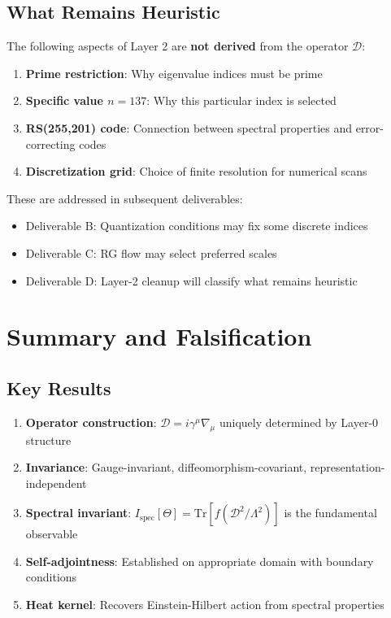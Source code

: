 \documentclass[12pt]{article}
\newcommand{\Tr}{\mathrm{Tr}}
\begin{document}
\subsection{What Remains Heuristic}

The following aspects of Layer 2 are \textbf{not derived} from the operator $\mathcal{D}$:
\begin{enumerate}
    \item \textbf{Prime restriction}: Why eigenvalue indices must be prime
    \item \textbf{Specific value $n=137$}: Why this particular index is selected
    \item \textbf{RS(255,201) code}: Connection between spectral properties and error-correcting codes
    \item \textbf{Discretization grid}: Choice of finite resolution for numerical scans
\end{enumerate}

These are addressed in subsequent deliverables:
\begin{itemize}
    \item Deliverable B: Quantization conditions may fix some discrete indices
    \item Deliverable C: RG flow may select preferred scales
    \item Deliverable D: Layer-2 cleanup will classify what remains heuristic
\end{itemize}

\section{Summary and Falsification}

\subsection{Key Results}

\begin{enumerate}
    \item \textbf{Operator construction}: $\mathcal{D} = i \gamma^\mu \nabla_\mu$ uniquely determined by Layer-0 structure
    \item \textbf{Invariance}: Gauge-invariant, diffeomorphism-covariant, representation-independent
    \item \textbf{Spectral invariant}: $I_{\text{spec}}[\Theta] = \Tr[f(\mathcal{D}^2/\Lambda^2)]$ is the fundamental observable
    \item \textbf{Self-adjointness}: Established on appropriate domain with boundary conditions
    \item \textbf{Heat kernel}: Recovers Einstein-Hilbert action from spectral properties
\end{enumerate}
\end{document}
